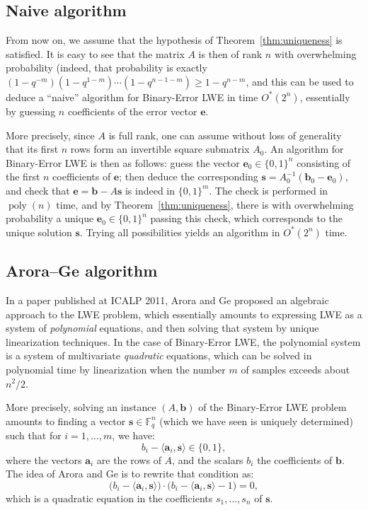 \documentclass[a4paper]{article}
\theoremstyle{definition}
\theoremstyle{remark}
\DeclareMathOperator{\poly}{poly}
\renewcommand{\vec}{\mathbf}
\newcommand{\F}{\mathbb{F}}
\begin{document}
\subsection{Naive algorithm}

From now on, we assume that the hypothesis of
Theorem~\ref{thm:uniqueness} is satisfied. It is easy to see that the
matrix $A$ is then of rank $n$ with overwhelming probability (indeed,
that probability is exactly $(1-q^{-m})(1-q^{1-m})\cdots(1-q^{n-1-m})
\geq 1-q^{n-m}$, and this can be used to deduce a ``naive'' algorithm
for Binary-Error LWE in time $O^*(2^n)$, essentially by guessing $n$
coefficients of the error vector $\vec e$.

More precisely, since $A$ is full rank, one can assume without loss of
generality that its first $n$ rows form an invertible square submatrix
$A_0$. An algorithm for Binary-Error LWE is then as follows: guess the
vector $\vec e_0\in \{0,1\}^n$ consisting of the first $n$ coefficients
of $\vec e$; then deduce the corresponding $\vec s = A_0^{-1}(\vec
b_0-\vec e_0)$, and check that $\vec e = \vec b - A\vec s$ is indeed in
$\{0,1\}^m$. The check is performed in $\poly(n)$ time, and by
Theorem~\ref{thm:uniqueness}, there is with overwhelming probability a
unique $\vec e_0\in\{0,1\}^n$ passing this check, which corresponds to
the unique solution $\vec s$. Trying all possibilities yields an
algorithm in $O^*(2^n)$ time.

\subsection{Arora--Ge algorithm}

In a paper published at ICALP 2011, Arora and Ge proposed an algebraic
approach to the LWE problem, which essentially amounts to expressing LWE
as a system of \emph{polynomial} equations, and then solving that system by
unique linearization techniques. In the case of Binary-Error LWE, the
polynomial system is a system of multivariate \emph{quadratic} equations,
which can be solved in polynomial time by linearization when the number
$m$ of samples exceeds about $n^2/2$.

More precisely, solving an instance $(A,\vec b)$ of the Binary-Error LWE
problem amounts to finding a vector $\vec s\in\F_q^n$ (which we have seen
is uniquely determined) such that for $i=1,\dots,m$, we have:
\[ b_i - \langle\vec a_i,\vec s\rangle \in \{0,1\}, \]
where the vectors $\vec a_i$ are the rows of $A$, and the scalars $b_i$
the coefficients of $\vec b$. The idea of Arora and Ge is to rewrite that
condition as:
\[ \big(b_i - \langle\vec a_i,\vec s\rangle\big)\cdot\big(b_i -
\langle\vec a_i,\vec s\rangle - 1\big) = 0, \]
which is a quadratic equation in the coefficients $s_1,\dots,s_n$ of
$\vec s$.
\end{document}

